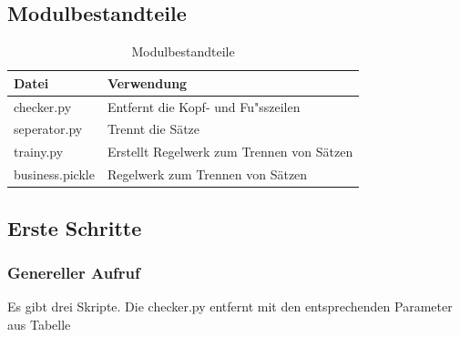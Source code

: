 \documentclass[12pt]{scrartcl}
\begin{document}
\subsection{Modulbestandteile}
\label{sec:modulbestandteile}
\begin{table}[H]
\centering
\label{modulbestandteil}
\begin{tabular}{|l|l|}
\hline
\rowcolor[HTML]{9B9B9B} 
Datei                & Verwendung                                 \\ \hline
checker.py           & Entfernt die Kopf- und Fu"sszeilen         \\ \hline
seperator.py         & Trennt die Sätze                           \\ \hline
trainy.py            & Erstellt Regelwerk zum Trennen von Sätzen  \\ \hline
business.pickle      & Regelwerk zum Trennen von Sätzen           \\ \hline
\end{tabular}
\caption{Modulbestandteile}
\end{table}
\newpage
\subsection{Erste Schritte}
\label{sec:first-steps}
\subsubsection{Genereller Aufruf}
\label{sec:first-steps-general}
Es gibt drei Skripte. Die checker.py entfernt mit den entsprechenden Parameter aus Tabelle 
\end{document}
